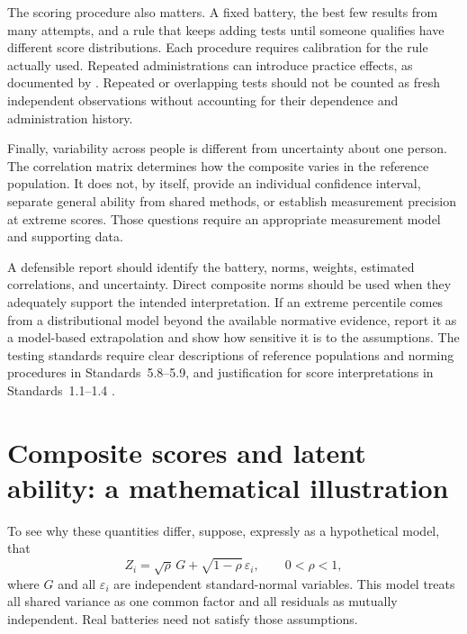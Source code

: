 \documentclass[
  a4paper,fontsize=11pt,parskip=half,headings=small,
  numbers=noenddot,bibliography=totoc
]{scrartcl}
\begin{document}
The scoring procedure also matters. A fixed battery, the best few results
from many attempts, and a rule that keeps adding tests until someone
qualifies have different score distributions. Each procedure requires
calibration for the rule actually used. Repeated administrations can
introduce practice effects, as documented by \citet{hausknecht2007}.
Repeated or overlapping tests should not be counted as fresh independent
observations without accounting for their dependence and administration
history.

Finally, variability across people is different from uncertainty about one
person. The correlation matrix determines how the composite varies in the
reference population. It does not, by itself, provide an individual
confidence interval, separate general ability from shared methods, or
establish measurement precision at extreme scores. Those questions require
an appropriate measurement model and supporting data.

A defensible report should identify the battery, norms, weights, estimated
correlations, and uncertainty. Direct composite norms should be used when
they adequately support the intended interpretation. If an extreme
percentile comes from a distributional model beyond the available normative
evidence, report it as a model-based extrapolation and show how sensitive
it is to the assumptions. The testing standards require clear descriptions
of reference populations and norming procedures in Standards~5.8--5.9,
and justification for score interpretations in Standards~1.1--1.4
\citep{standards2014}.

\appendix
\section{Composite scores and latent ability: a mathematical illustration}
\label{sec:latent}

To see why these quantities differ, suppose, expressly as a hypothetical
model, that
\begin{equation}
  Z_i=\sqrt{\rho}\,G+\sqrt{1-\rho}\,\varepsilon_i,
  \qquad 0<\rho<1,
  \label{eq:factor-model}
\end{equation}
where \(G\) and all \(\varepsilon_i\) are independent standard-normal
variables. This model treats all shared variance as one common factor and
all residuals as mutually independent. Real batteries need not satisfy
those assumptions.
\end{document}
